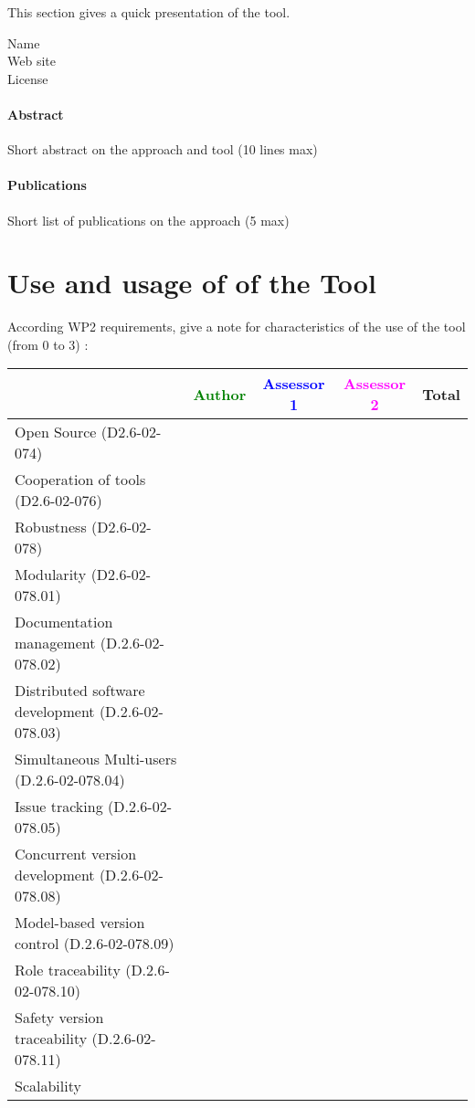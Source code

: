 This section gives a quick presentation of the tool.

\begin{description}
\item[Name] 
\item[Web site] 
\item[License] 
\end{description}

\paragraph{Abstract} Short abstract on the approach and tool (10 lines max)

\paragraph{Publications} Short list of publications on the approach (5 max)

\section{Use and usage of  of the Tool}
According WP2 requirements, give a note for characteristics of the use of the tool (from 0 to 3) :

\begin{tabular}{|l | c | c | c | c|}
\hline
& \textcolor{green}{Author} & \textcolor{blue}{Assessor 1} & \textcolor{magenta}{Assessor 2} & Total \\
\hline 
Open Source (D2.6-02-074) & & & &  \\
\hline 
Cooperation of tools (D2.6-02-076) & & & &  \\
\hline
Robustness (D2.6-02-078) & & & & \\
\hline
Modularity (D2.6-02-078.01) & & & & \\
\hline
Documentation management (D.2.6-02-078.02) & & & & \\
\hline
Distributed software development (D.2.6-02-078.03)  & & & & \\
\hline
Simultaneous Multi-users (D.2.6-02-078.04)   & & & & \\
\hline
Issue tracking (D.2.6-02-078.05) & & & & \\
\hline
Concurrent version development (D.2.6-02-078.08) & & & & \\
\hline
Model-based version control (D.2.6-02-078.09) & & & & \\
\hline
Role traceability (D.2.6-02-078.10) & & & & \\
\hline
Safety version traceability (D.2.6-02-078.11) & & & & \\
\hline
Scalability & & & & \\
\hline
\end{tabular}

